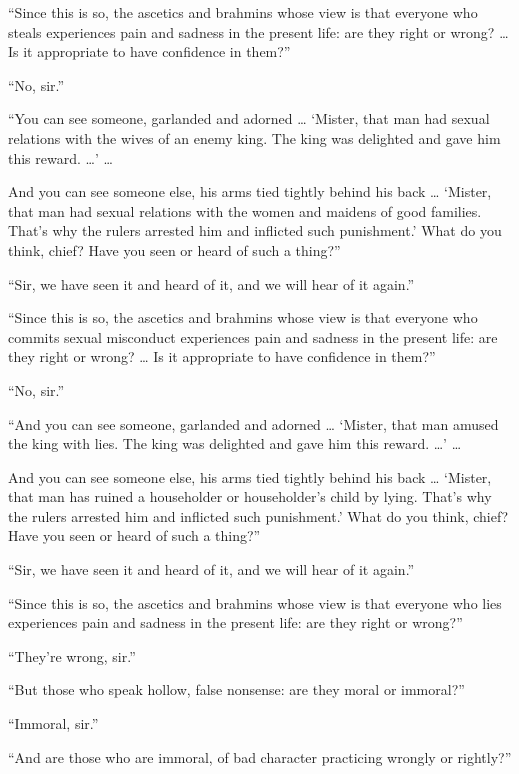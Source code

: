 \documentclass[12pt,openany]{book}%
\begin{document}
“Since this is so, the ascetics and brahmins whose view is that everyone who steals experiences pain and sadness in the present life: are they right or wrong? … Is it appropriate to have confidence in them?” 

“No, sir.” 

“You can see someone, garlanded and adorned … ‘Mister, that man had sexual relations with the wives of an enemy king. The king was delighted and gave him this reward. …’ … 

And you can see someone else, his arms tied tightly behind his back … ‘Mister, that man had sexual relations with the women and maidens of good families. That’s why the rulers arrested him and inflicted such punishment.’ What do you think, chief? Have you seen or heard of such a thing?” 

“Sir, we have seen it and heard of it, and we will hear of it again.” 

“Since this is so, the ascetics and brahmins whose view is that everyone who commits sexual misconduct experiences pain and sadness in the present life: are they right or wrong? … Is it appropriate to have confidence in them?” 

“No, sir.” 

“And you can see someone, garlanded and adorned … ‘Mister, that man amused the king with lies. The king was delighted and gave him this reward. …’ … 

And you can see someone else, his arms tied tightly behind his back … ‘Mister, that man has ruined a householder or householder’s child by lying. That’s why the rulers arrested him and inflicted such punishment.’ What do you think, chief? Have you seen or heard of such a thing?” 

“Sir, we have seen it and heard of it, and we will hear of it again.” 

“Since this is so, the ascetics and brahmins whose view is that everyone who lies experiences pain and sadness in the present life: are they right or wrong?” 

“They’re wrong, sir.” 

“But those who speak hollow, false nonsense: are they moral or immoral?” 

“Immoral, sir.” 

“And are those who are immoral, of bad character practicing wrongly or rightly?” 
\end{document}
